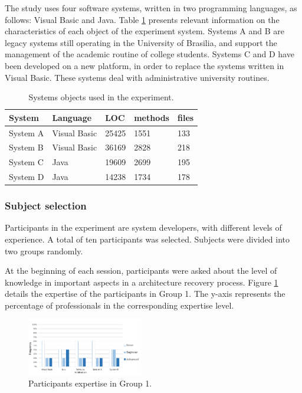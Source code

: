 \documentclass{sig-alternate-05-2015}
\begin{document}
The study uses four software systems, written in two programming languages, as follows: Visual Basic and Java. Table \ref{tabelaSistemasObjetos}  presents relevant information on the characteristics of each object of the experiment system. Systems A and B are legacy systems still operating in the University of Brasilia, and support the management of the academic routine of college students. Systems C and D have been developed on a new platform, in order to replace the systems written in Visual Basic. These systems deal with administrative university routines.

\begin{table}[h]
	\centering
	\caption{Systems objects used in the experiment.}
	\label{tabelaSistemasObjetos}
	\begin{tabular}{|lllll|}
		\hline
		System  & Language    & LOC   &  methods & files  \\ \hline
		System A             & Visual Basic & 25425 & 1551       & 133        \\
		System B           & Visual Basic & 36169 & 2828       & 218        \\
		System C            & Java         & 19609 & 2699       & 195        \\
		System D           & Java         & 14238 & 1734       & 178        \\ \hline
	\end{tabular}
\end{table}

\subsubsection{Subject selection}%
Participants in the experiment are system developers, with different levels of experience. A total of ten participants was selected. Subjects were divided into two groups randomly.

At the beginning of each session, participants were asked about the level of knowledge in important aspects in a architecture recovery process. Figure \ref {conhecimentoGrupo1} details the expertise of the participants in Group 1. The y-axis represents the percentage of professionals in the corresponding expertise level.

\begin{figure}[!h]
	\centering
	\includegraphics[width=0.45\textwidth]{6_expertise_participantes_grupo_1_en}
	\caption{Participants expertise in Group 1.}
	\label{conhecimentoGrupo1}
\end{figure}
\end{document}

